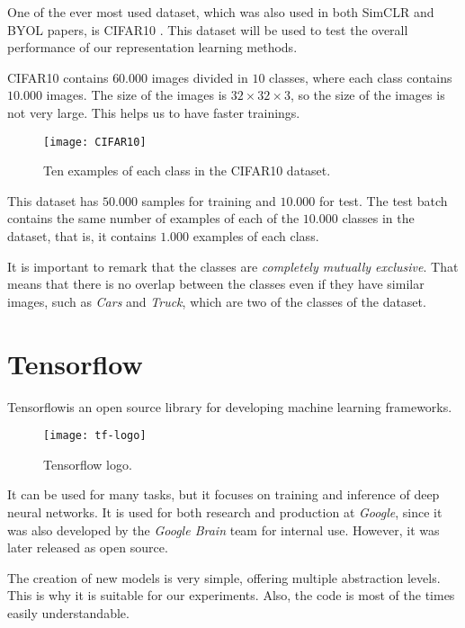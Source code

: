 One of the ever most used dataset, which was also used in both SimCLR and BYOL papers, is CIFAR10 \citep{krizhevsky_learning_nodate}. This dataset will be used to test the overall performance of our representation learning methods.

CIFAR10 contains $60.000$ images divided in $10$ classes, where each class contains $10.000$ images. The size of the images is $32\times 32\times 3$, so the size of the images is not very large. This helps us to have faster trainings.

\begin{figure}[H]
    \centering 
    \texttt{[image: CIFAR10]}
    \caption{Ten examples of each class in the CIFAR10 dataset. }
\end{figure}
This dataset has $50.000$ samples for training and $10.000$ for test. The test batch contains the same number of examples of each of the $10.000$ classes in the dataset, that is, it contains $1.000$ examples of each class. 

It is important to remark that the classes are \emph{completely mutually exclusive}. That means that there is no overlap between the classes even if they have similar images, such as \emph{Cars} and \emph{Truck}, which are two of the classes of the dataset.

\section{Tensorflow}



Tensorflow\footnotemark is an open source library for developing machine learning frameworks.  

\begin{wrapfigure}{r}{5cm}
    \caption{Tensorflow logo.}
    \texttt{[image: tf-logo]}
\end{wrapfigure}




It can be used for many tasks, but it focuses on training and inference of deep neural networks. It is used for both research and production at \emph{Google}, since it was also developed by the \emph{Google Brain} team for internal use. However, it was later released as open source.

The creation of new models is very simple, offering multiple abstraction levels. This is why it is suitable for our experiments. Also, the code is most of the times easily understandable.

